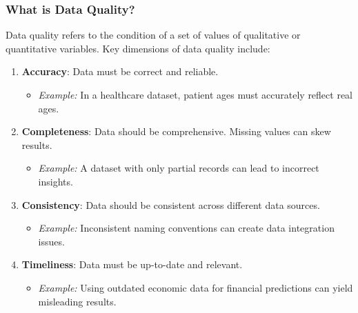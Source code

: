 \documentclass[aspectratio=169]{beamer}
\begin{document}
\begin{frame}[fragile]
  \frametitle{What is Data Quality?}

  Data quality refers to the condition of a set of values of qualitative or quantitative variables. Key dimensions of data quality include:
  
  \begin{enumerate}
    \item \textbf{Accuracy}: Data must be correct and reliable.
      \begin{itemize}
        \item \textit{Example:} In a healthcare dataset, patient ages must accurately reflect real ages.
      \end{itemize}
    \item \textbf{Completeness}: Data should be comprehensive. Missing values can skew results.
      \begin{itemize}
        \item \textit{Example:} A dataset with only partial records can lead to incorrect insights.
      \end{itemize}
    \item \textbf{Consistency}: Data should be consistent across different data sources.
      \begin{itemize}
        \item \textit{Example:} Inconsistent naming conventions can create data integration issues.
      \end{itemize}
    \item \textbf{Timeliness}: Data must be up-to-date and relevant.
      \begin{itemize}
        \item \textit{Example:} Using outdated economic data for financial predictions can yield misleading results.
      \end{itemize}
  \end{enumerate}

\end{frame}
\end{document}
